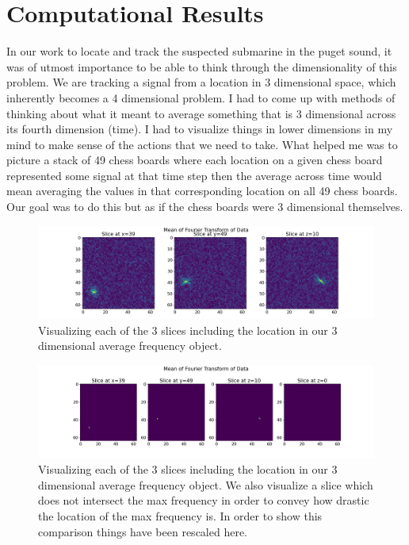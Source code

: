 \documentclass[11pt]{amsart}
\begin{document}
\section{Computational Results}\label{sec:results}
In our work to locate and track the suspected submarine in the puget sound, it was of utmost importance to be able to think through the dimensionality of this problem.
We are tracking a signal from a location in 3 dimensional space, which inherently becomes a 4 dimensional problem.
I had to come up with methods of thinking about what it meant to average something that is 3 dimensional across its fourth dimension (time).
I had to visualize things in lower dimensions in my mind to make sense of the actions that we need to take.
What helped me was to picture a stack of 49 chess boards where each location on a given chess board represented some signal at that time step then the average across time would mean averaging the values in that corresponding location on all 49 chess boards.
Our goal was to do this but as if the chess boards were 3 dimensional themselves.

\begin{figure}[h]
	\centering
	\includegraphics[width=1\textwidth]{../visualizations/visualizing_dominant_frequency.png}
 	\caption{Visualizing each of the 3 slices including the location in our 3 dimensional average frequency object.}\label{fig:f1_0}
\end{figure}

\begin{figure}[h]
	\centering
	\includegraphics[width=1\textwidth]{../visualizations/visualizing_dominant_frequency_plus.png}
 	\caption{Visualizing each of the 3 slices including the location in our 3 dimensional average frequency object. We also visualize a slice which does not intersect the max frequency in order to convey how drastic the location of the max frequency is. In order to show this comparison things have been rescaled here.}\label{fig:f1}
\end{figure}
\end{document}
